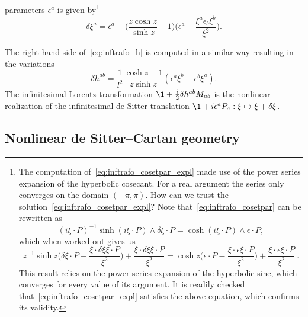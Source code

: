\documentclass[
final,
11pt,
a4paper,
DIV=11,
headinclude=true,
footinclude=false,
bibliography=totoc,
twoside=true,  %
BCOR=5mm
]{scrbook}
\begin{document}
parameters $\epsilon^a$ is given by\footnote{The computation 
  of~\eqref{eq:inftrafo_cosetpar_expl} made use of the power 
  series expansion of the hyperbolic cosecant. For a real 
  argument the series only converges on the domain $(-\pi,\pi)$.  
  How can we trust the 
  solution~\eqref{eq:inftrafo_cosetpar_expl}?  Note 
  that~\eqref{eq:inftrafo_cosetpar} can be rewritten as
  \begin{equation*}
    {(i\xi\cdot P)}^{-1} \sinh(i\xi\cdot P) \wedge \delta\xi\cdot 
    P = \cosh(i\xi\cdot P) \wedge \epsilon\cdot P,
  \end{equation*}
  which when worked out gives us
  \begin{equation*}
    z^{-1}\sinh z \Big(\delta\xi\cdot P - \frac{\xi\cdot \delta\xi 
      \xi\cdot P}{\xi^2}\Big) + \frac{\xi\cdot \delta\xi \xi\cdot 
      P}{\xi^2}
    = \cosh z \Big(\epsilon\cdot P - \frac{\xi\cdot\epsilon 
      \xi\cdot P}{\xi^2}\Big) + \frac{\xi\cdot\epsilon \xi\cdot 
      P}{\xi^2}~.
  \end{equation*}
  This result relies on the power series expansion of the 
  hyperbolic sine, which converges for every value of its 
  argument. It is readily checked 
  that~\eqref{eq:inftrafo_cosetpar_expl} satisfies the above 
  equation, which confirms its validity.}
\begin{equation}
\label{eq:inftrafo_cosetpar_expl}
  \delta\xi^a = \epsilon^a + \Big(\frac{z\cosh z}{\sinh z} - 
  1\Big) \bigg(\epsilon^a - \frac{\xi^a \epsilon_b 
    \xi^b}{\xi^2}\bigg).
\end{equation}

The right-hand side of~\eqref{eq:inftrafo_h} is computed in 
a similar way resulting in the variations%
\begin{equation}
\label{eq:inf_tr_h}
  \delta h^{ab} = \frac{1}{l^2} \frac{\cosh z - 1}{z\sinh z} 
  (\epsilon^a\xi^b - \epsilon^b\xi^a).
\end{equation}
The infinitesimal Lorentz transformation $\1 + \tfrac{i}{2} 
\delta h^{ab} M_{ab}$ is the nonlinear realization of the 
infinitesimal de Sitter translation $\1 + i\epsilon^a P_a : \xi 
\mapsto \xi + \delta\xi$.


\subsection{Nonlinear de Sitter--Cartan geometry}
\end{document}
